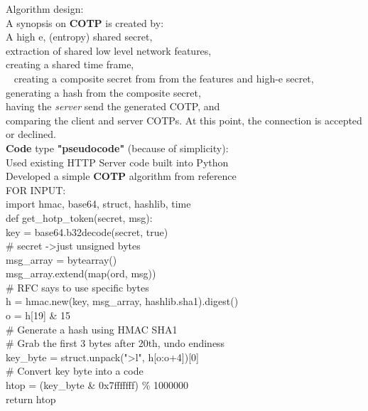 \documentclass[a4paper, 11pt]{article} 				%
\begin{document}
\noindent
Algorithm design:\\
A synopsis on \textbf{COTP} is created by:\\
\noindent
A high e, (entropy) shared secret,\\
extraction of shared low level network features,\\
creating a shared time frame,\\ 
creating a composite secret from from the features and high-e secret,\\
generating a hash from the composite secret,\\
having the \textit{server} send the generated COTP, and\\
comparing the client and server COTPs. At this point, the connection is accepted or declined.\\

\noindent
\textbf{Code} type \textbf{"pseudocode"} (because of simplicity):\\
\noindent
Used existing HTTP Server code built into Python\\
\noindent
Developed a simple \textbf{COTP} algorithm from reference\\

\noindent
FOR INPUT:\\
\noindent
import hmac, base64, struct, hashlib, time\\

\noindent
def get\_hotp\_token(secret, msg):\\
\indent key = base64.b32decode(secret, true)\\

\# secret -\textgreater just unsigned bytes\\
\indent msg\_array = bytearray()\\
\indent msg\_array.extend(map(ord, msg))\\

\# RFC says to use specific bytes\\
\indent h = hmac.new(key, msg\_array, hashlib.sha1).digest()\\
\indent o = h[19] \& 15\\

\# Generate a hash using HMAC SHA1\\
\indent \# Grab the first 3 bytes after 20th, undo endiness\\
\indent key\_byte = struct.unpack("\textgreater l", h[o:o+4])[0]\\
\indent \# Convert key byte into a code\\
\indent htop =  (key\_byte \& 0x7fffffff) \% 1000000\\
\indent return htop\\
\end{document}
